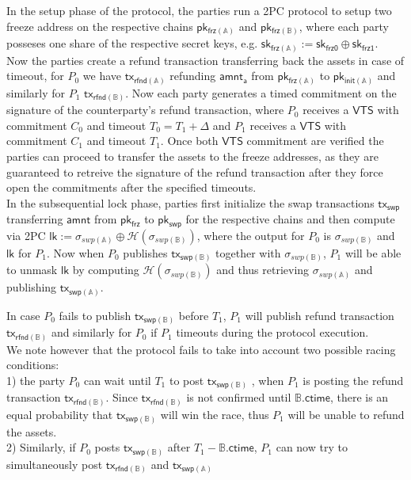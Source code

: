\documentclass{article}      	%
\begin{document}
In the setup phase of the protocol, the parties run a 2PC protocol to setup two freeze address on the respective chains $\mathsf{pk_{frz(\mathbb{A})}}$ and $\mathsf{pk_{frz(\mathbb{B})}}$, where each party posseses one share of the respective secret keys, e.g. $\mathsf{sk_{frz(\mathbb{A})}} := \mathsf{sk_{frz0}} \oplus  \mathsf{sk_{frz1}}$. \\
Now the parties create a refund transaction transferring back the assets in case of timeout, for $P_0$ we have $\mathsf{tx_{rfnd(\mathbb{A})}}$ refunding $\mathsf{amnt_a}$ from $\mathsf{pk_{frz(\mathbb{A})}}$ to $\mathsf{pk_{init(\mathbb{A})}}$ and similarly for $P_1$ $\mathsf{tx_{rfnd(\mathbb{B})}}$. Now each party generates a timed commitment on the signature of the counterparty's refund transaction, where $P_0$ receives a $\mathsf{VTS}$ with commitment $C_0$ and timeout $T_0 = T_1 + \Delta$ and $P_1$ receives a $\mathsf{VTS}$ with commitment $C_1$ and timeout $T_1$. Once both $\mathsf{VTS}$ commitment are verified the parties can proceed to transfer the assets to the freeze addresses, as they are guaranteed to  retreive the signature of the refund transaction after they force open the commitments after the specified timeouts. \\

In the subsequential lock phase, parties first initialize the swap transactions $\mathsf{tx_{swp}}$ transferring $\mathsf{amnt}$ from $\mathsf{pk_{frz}}$ to $\mathsf{pk_{swp}}$ for the respective chains and then compute via 2PC $\mathsf{lk} := \sigma_{swp(\mathbb{A})} \oplus \mathcal{H}(\sigma_{swp(\mathbb{B})})$, where the output for $P_0$ is $\sigma_{swp(\mathbb{B})}$ and $\mathsf{lk}$ for $P_1$. Now when $P_0$ publishes $\mathsf{tx_{swp(\mathbb{B})}}$ together with  $\sigma_{swp(\mathbb{B})}$, $P_1$ will be able to unmask $\mathsf{lk}$ by computing $\mathcal{H}(\sigma_{swp(\mathbb{B})})$ and thus retrieving $\sigma_{swp(\mathbb{A})}$ and publishing $\mathsf{tx_{swp(\mathbb{A})}}$.

In case $P_0$ fails to publish $\mathsf{tx_{swp(\mathbb{B})}}$ before $T_1$, $P_1$ will publish refund transaction  $\mathsf{tx_{rfnd(\mathbb{B})}}$ and similarly for $P_0$ if $P_1$ timeouts during the protocol execution. \\

We note however that the protocol fails to take into account two possible racing conditions: \\
1) the party $P_0$ can wait until $T_1$ to post $\mathsf{tx_{swp(\mathbb{B})}}$ , when $P_1$ is posting the refund transaction $\mathsf{tx_{rfnd(\mathbb{B})}}$. Since $\mathsf{tx_{rfnd(\mathbb{B})}}$ is not confirmed until $\mathbb{B}.\mathsf{ctime}$, there is an equal probability that $\mathsf{tx_{swp(\mathbb{B})}}$ will win the race, thus $P_1$ will be unable to refund the assets. \\ 
2) Similarly, if $P_0$ posts $\mathsf{tx_{swp(\mathbb{B})}}$ after $T_1 - \mathbb{B}.\mathsf{ctime}$, $P_1$ can now try to simultaneously post $\mathsf{tx_{rfnd(\mathbb{B})}}$ and $\mathsf{tx_{swp(\mathbb{A})}}$ \\
\end{document}
